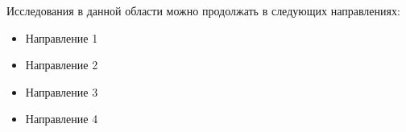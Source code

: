 \documentclass{spbau-diploma}
\begin{document}
Исследования в данной области можно продолжать в следующих направлениях:

\begin{itemize}
	\item Направление 1
	\item Направление 2
	\item Направление 3
	\item Направление 4
\end{itemize}





\end{document}
